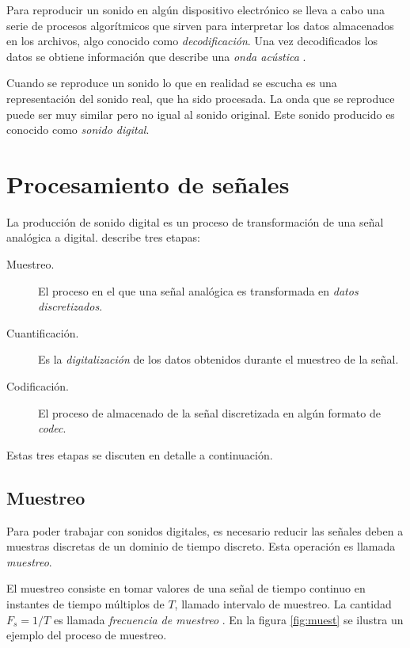 \noindent Para reproducir un sonido en alg\'un dispositivo electr\'onico se lleva a cabo una serie de procesos algor\'itmicos que sirven para interpretar los datos almacenados en los archivos, algo conocido como {\em decodificaci\'on}. Una vez decodificados los datos se obtiene informaci\'on que describe una {\em onda ac\'ustica} \cite{izaguirre2008sistemas}.

\noindent Cuando se reproduce un sonido lo que en realidad se escucha es una representaci\'on del sonido real, que ha sido procesada. La onda que se reproduce puede ser muy similar pero no igual al sonido original. Este sonido producido es conocido como {\em sonido digital}.

\section{Procesamiento de se\~nales}

La producci\'on de sonido digital es un proceso de transformaci\'on de una se\~nal anal\'ogica a digital. \citet{Baher} describe tres etapas:

\begin{description}
\item[Muestreo.]{El proceso en el que una se\~nal anal\'ogica es transformada en {\em datos discretizados}.}
\item[Cuantificaci\'on.]{Es la {\em digitalizaci\'on} de los datos obtenidos durante el muestreo de la se\~nal.}
\item[Codificaci\'on.]{El proceso de almacenado de la se\~nal discretizada en alg\'un formato de {\em codec}.}
\end{description}

\noindent Estas tres etapas se discuten en detalle a continuaci\'on.

\subsection{Muestreo}

Para poder trabajar con sonidos digitales, es necesario reducir las se\~nales deben a muestras discretas de un dominio de tiempo discreto. Esta operaci\'on es llamada {\em muestreo}.

\noindent El muestreo consiste en tomar valores de una se\~nal de tiempo continuo en instantes de tiempo m\'ultiplos de $T$, llamado intervalo de muestreo. La cantidad $F_s = 1/T$ es llamada {\em frecuencia de muestreo} \cite{Davide}. En la figura \ref{fig:muest} se ilustra un ejemplo del proceso de muestreo.

